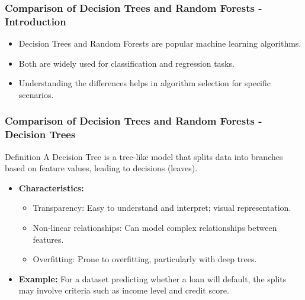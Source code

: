 \documentclass[aspectratio=169]{beamer}
\begin{document}
\begin{frame}
    \frametitle{Comparison of Decision Trees and Random Forests - Introduction}
    \begin{itemize}
        \item Decision Trees and Random Forests are popular machine learning algorithms.
        \item Both are widely used for classification and regression tasks.
        \item Understanding the differences helps in algorithm selection for specific scenarios.
    \end{itemize}
\end{frame}

\begin{frame}
    \frametitle{Comparison of Decision Trees and Random Forests - Decision Trees}
    \begin{block}{Definition}
        A Decision Tree is a tree-like model that splits data into branches based on feature values, leading to decisions (leaves).
    \end{block}
    
    \begin{itemize}
        \item \textbf{Characteristics:}
        \begin{itemize}
            \item Transparency: Easy to understand and interpret; visual representation.
            \item Non-linear relationships: Can model complex relationships between features.
            \item Overfitting: Prone to overfitting, particularly with deep trees.
        \end{itemize}
        
        \item \textbf{Example:} 
        For a dataset predicting whether a loan will default, the splits may involve criteria such as income level and credit score.
    \end{itemize}
\end{frame}
\end{document}
